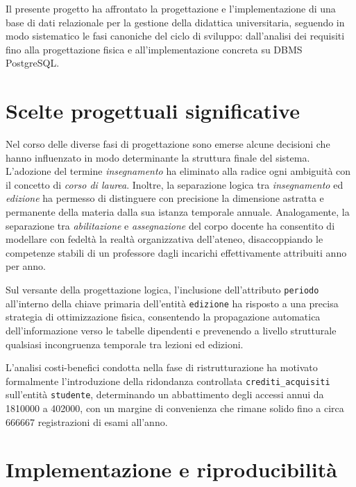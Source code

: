 Il presente progetto ha affrontato la progettazione e l'implementazione di una base di dati relazionale per la gestione della didattica universitaria, seguendo in modo sistematico le fasi canoniche del ciclo di sviluppo: dall'analisi dei requisiti fino alla progettazione fisica e all'implementazione concreta su DBMS PostgreSQL.

\section{Scelte progettuali significative}
\label{sec:scelte-progettuali-significative}

Nel corso delle diverse fasi di progettazione sono emerse alcune decisioni che hanno influenzato in modo determinante la struttura finale del sistema. L'adozione del termine \textit{insegnamento} ha eliminato alla radice ogni ambiguità con il concetto di \textit{corso di laurea}.
Inoltre, la separazione logica tra \textit{insegnamento} ed \textit{edizione} ha permesso di distinguere con precisione la dimensione astratta e permanente della materia dalla sua istanza temporale annuale.
Analogamente, la separazione tra \textit{abilitazione} e \textit{assegnazione} del corpo docente ha consentito di modellare con fedeltà la realtà organizzativa dell'ateneo, disaccoppiando le competenze stabili di un professore dagli incarichi effettivamente attribuiti anno per anno.

Sul versante della progettazione logica, l'inclusione dell'attributo \texttt{periodo} all'interno della chiave primaria dell'entità \texttt{edizione} ha risposto a una precisa strategia di ottimizzazione fisica, consentendo la propagazione automatica dell'informazione verso le tabelle dipendenti e prevenendo a livello strutturale qualsiasi incongruenza temporale tra lezioni ed edizioni.

L'analisi costi-benefici condotta nella fase di ristrutturazione ha motivato formalmente l'introduzione della ridondanza controllata \texttt{crediti\_acquisiti} sull'entità \texttt{studente}, determinando un abbattimento degli accessi annui da \num{1810000} a \num{402000}, con un margine di convenienza che rimane solido fino a circa \num{666667} registrazioni di esami all'anno.

\section{Implementazione e riproducibilità}
\label{sec:implementazione-e-riproducibilita}

